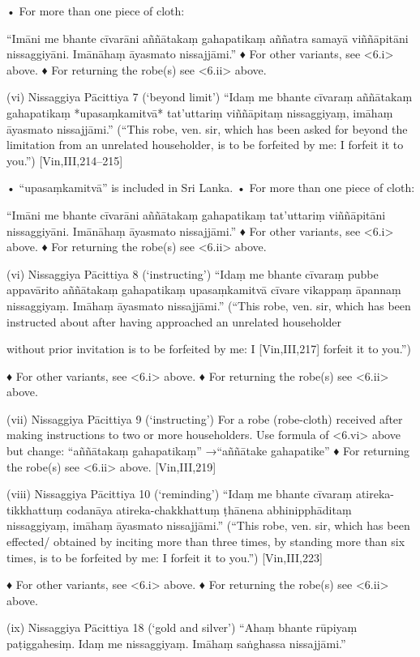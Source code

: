 • For more than one piece of cloth:

“Imāni me bhante cīvarāni aññātakaṃ
gahapatikaṃ aññatra samayā viññāpitāni
nissaggiyāni. Imānāhaṃ āyasmato nissajjāmi.”
♦ For other variants, see <6.i> above.
♦ For returning the robe(s) see <6.ii> above.

(vi) Nissaggiya Pācittiya 7 (‘beyond limit’)
“Idaṃ me bhante cīvaraṃ aññātakaṃ
gahapatikaṃ *upasaṃkamitvā* tat’uttariṃ
viññāpitaṃ nissaggiyaṃ,
imāhaṃ āyasmato nissajjāmi.”
(“This robe, ven. sir, which has been asked for beyond
the limitation from an unrelated householder, is to be
forfeited by me: I forfeit it to you.”)
[Vin,III,214–215]

• “upasaṃkamitvā” is included in Sri Lanka.
• For more than one piece of cloth:

“Imāni me bhante cīvarāni aññātakaṃ
gahapatikaṃ tat’uttariṃ viññāpitāni
nissaggiyāni. Imānāhaṃ āyasmato nissajjāmi.”
♦ For other variants, see <6.i> above.
♦ For returning the robe(s) see <6.ii> above.

(vi) Nissaggiya Pācittiya 8 (‘instructing’)
“Idaṃ me bhante cīvaraṃ pubbe appavārito
aññātakaṃ gahapatikaṃ upasaṃkamitvā
cīvare vikappaṃ āpannaṃ nissaggiyaṃ.
Imāhaṃ āyasmato nissajjāmi.”
(“This robe, ven. sir, which has been instructed about
after having approached an unrelated householder

without prior invitation is to be forfeited by me: I
[Vin,III,217]
forfeit it to you.”)

♦ For other variants, see <6.i> above.
♦ For returning the robe(s) see <6.ii> above.

(vii) Nissaggiya Pācittiya 9 (‘instructing’)
For a robe (robe-cloth) received after making
instructions to two or more householders. Use
formula of <6.vi> above but change:
“aññātakaṃ gahapatikaṃ”
→“aññātake gahapatike”
♦ For returning the robe(s) see <6.ii> above.
[Vin,III,219]

(viii) Nissaggiya Pācittiya 10 (‘reminding’)
“Idaṃ me bhante cīvaraṃ atireka-tikkhattuṃ
codanāya atireka-chakkhattuṃ ṭhānena
abhinipphāditaṃ nissaggiyaṃ,
imāhaṃ āyasmato nissajjāmi.”
(“This robe, ven. sir, which has been effected/
obtained by inciting more than three times, by
standing more than six times, is to be forfeited
by me: I forfeit it to you.”)
[Vin,III,223]

♦ For other variants, see <6.i> above.
♦ For returning the robe(s) see <6.ii> above.

(ix) Nissaggiya Pācittiya 18 (‘gold and silver’)
“Ahaṃ bhante rūpiyaṃ paṭiggahesiṃ.
Idaṃ me nissaggiyaṃ.
Imāhaṃ saṅghassa nissajjāmi.”


